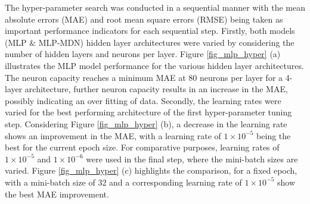 \documentclass[a4paper,fleqn]{cas-dc}
\begin{document}
The hyper-parameter search was conducted in a sequential manner with the mean absolute errors (MAE) and root mean square errors (RMSE) being taken as important performance indicators for each sequential step. Firstly, both models (MLP \& MLP-MDN) hidden layer architectures were varied by considering the number of hidden layers and neurons per layer. Figure \ref{fig_mlp_hyper} (a) illustrates the MLP model performance for the various hidden layer architectures. The neuron capacity reaches a minimum MAE at 80 neurons per layer for a 4-layer architecture, further neuron capacity results in an increase in the MAE, possibly indicating an over fitting of data. Secondly, the learning rates were varied for the best performing architecture of the first hyper-parameter tuning step. Considering Figure \ref{fig_mlp_hyper} (b), a decrease in the learning rate shows an improvement in the MAE, with a learning rate of $1\times10^{-5}$ being the best for the current epoch size. For comparative purposes, learning rates of $1\times10^{-5}$ and $1\times10^{-6}$ were used in the final step, where the mini-batch sizes are varied. Figure \ref{fig_mlp_hyper} (c) highlights the comparison, for a fixed epoch, with a mini-batch size of 32 and a corresponding learning rate of $1\times10^{-5}$ show the best MAE improvement.\\
\end{document}
